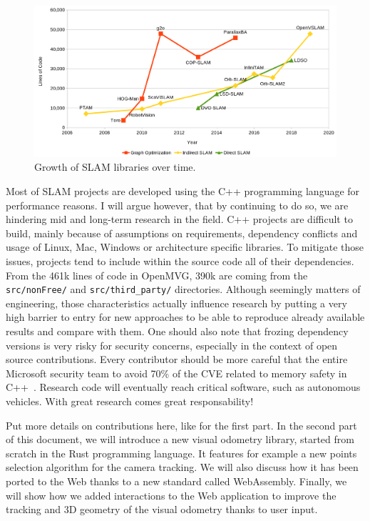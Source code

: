 \begin{figure}[h]
	\centering
	\includegraphics[width=\linewidth]{assets/img/slam-cloc.png}
	\caption{Growth of SLAM libraries over time.}%
	\label{fig:assets/img/slam-cloc}
\end{figure}

Most of SLAM projects are developed using the C++ programming language for performance reasons.
I will argue however, that by continuing to do so, we are hindering mid and long-term research
in the field.
C++ projects are difficult to build, mainly because of assumptions on requirements,
dependency conflicts and usage of Linux, Mac, Windows or architecture specific libraries.
To mitigate those issues, projects tend to include within the source code all of their dependencies.
From the 461k lines of code in OpenMVG, 390k are coming from the \verb|src/nonFree/|
and \verb|src/third_party/| directories.
Although seemingly matters of engineering, those characteristics actually influence research
by putting a very high barrier to entry for new approaches to be able
to reproduce already available results and compare with them.
One should also note that frozing dependency versions is very risky for security concerns,
especially in the context of open source contributions.
\alert{Every contributor should be more careful that the entire Microsoft security team
to avoid 70\% of the CVE related to memory safety in C++}~\cite{msrc-safer}.
Research code will eventually reach critical software, such as autonomous vehicles.
With great research comes great responsability!

\alert{Put more details on contributions here, like for the first part.}
In the second part of this document, we will introduce a new visual odometry library,
started from scratch in the Rust programming language.
It features for example a new points selection algorithm for the camera tracking.
We will also discuss how it has been ported to the Web thanks to a new standard called WebAssembly.
Finally, we will show how we added interactions to the Web application
to improve the tracking and 3D geometry of the visual odometry thanks to user input.
